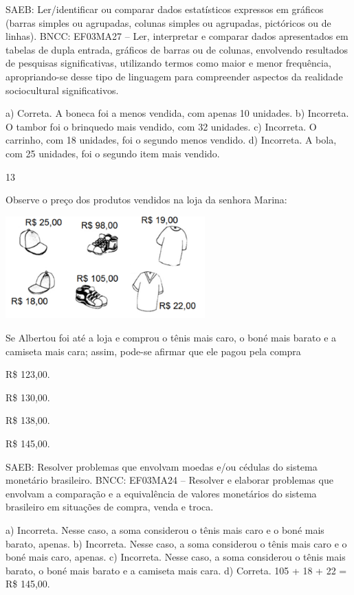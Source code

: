 {\begin{escolha}
{SAEB: Ler/identificar ou comparar dados estatísticos
expressos em gráficos (barras simples ou agrupadas, colunas simples ou agrupadas, pictóricos ou de linhas).
BNCC: EF03MA27 -- Ler, interpretar e comparar dados apresentados em tabelas de dupla entrada,
gráficos de barras ou de colunas, envolvendo resultados de pesquisas significativas, utilizando
termos como maior e menor frequência, apropriando-se desse tipo de linguagem para
compreender aspectos da realidade sociocultural significativos.

a) Correta. A boneca foi a menos vendida, com apenas 10 unidades.
b) Incorreta. O tambor foi o brinquedo mais vendido, com 32 unidades.
c) Incorreta. O carrinho, com 18 unidades, foi o segundo menos vendido.
d) Incorreta. A bola, com 25 unidades, foi o segundo item mais vendido.

\num{13}

Observe o preço dos produtos vendidos na loja da senhora Marina:


\includegraphics[width=3.02451in,height=1.54853in]{media/image138.png}

Se Albertou foi até a loja e comprou o tênis mais caro, o boné mais barato e a camiseta mais cara; assim, pode-se afirmar que ele pagou pela compra

\begin{escolha}

\item
  R\$ 123,00.
\item
  R\$ 130,00.
\item
  R\$ 138,00.
\item
  R\$ 145,00.
\end{escolha}

SAEB: Resolver problemas que envolvam moedas e/ou cédulas do sistema monetário brasileiro.
BNCC: EF03MA24 -- Resolver e elaborar problemas que envolvam a comparação e a equivalência de
valores monetários do sistema brasileiro em situações de compra, venda e troca.

a) Incorreta. Nesse caso, a soma considerou o tênis mais caro e o boné mais barato, apenas.
b) Incorreta. Nesse caso, a soma considerou o tênis mais caro e o boné mais caro, apenas.
c) Incorreta. Nesse caso, a soma considerou o tênis mais barato, o boné mais barato e a camiseta mais cara.
d) Correta. 105 + 18 + 22 = R\$ 145,00.

}
\end{escolha}}
